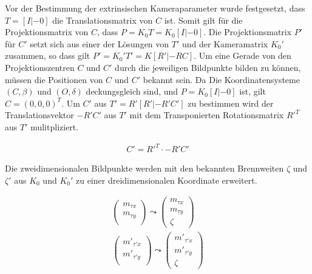 Vor der Bestimmung der extrinsischen Kameraparameter wurde festgesetzt, dass $T = [I|-0]$ die Translationsmatrix von $C$ ist. Somit gilt für die Projektionsmatrix von $C$, dass $P= K_0T =K_0[I|-0]$. Die Projektionsmatrix $P'$ für $C'$ setzt sich aus einer der Lösungen von $T'$ und der Kameramatrix $K_0'$ zusammen, so dass gilt $P'=K_0'T' = K[R'|-RC]$. Um eine Gerade von den Projektionszentren $C$ und $C'$ durch die jeweiligen Bildpunkte bilden zu können, müssen die Positionen von $C$ und $C'$ bekannt sein. Da Die Koordinatensysteme $(C,\beta)$ und $(O,\delta)$ deckungsgleich sind, und $P = K_0[I|-0]$ ist, gilt $C = (0,0,0)^T$.  Um $C'$ aus $T' = R'[R'|-R'C']$ zu bestimmen wird der Translationsvektor $-R'C'$ aus $T'$ mit dem Transponierten Rotationsmatrix $R'^T$ aus $T'$ mulitpliziert.

\begin{gather}
	C' =  R'^T \cdot -R'C' 
\end{gather}

%

Die zweidimensionalen Bildpunkte werden mit den bekannten Brennweiten $\zeta$ und $\zeta'$ aus $K_0$ und $K_0'$ zu einer dreidimensionalen Koordinate erweitert.

\begin{gather}
	\begin{pmatrix}
	m_{\tau x}\\
	m_{\tau y}\\
	\end{pmatrix} \leadsto 
		\begin{pmatrix}
	m_{\tau x} \\
	m_{\tau y}\\
	\zeta
	\end{pmatrix}\\
		\begin{pmatrix}
	m'_{\tau' x}\\
	m'_{\tau' y}\\
	\end{pmatrix} \leadsto 
	\begin{pmatrix}
	m'_{\tau' x} \\
	m'_{\tau' y}\\
	\zeta
	\end{pmatrix}	
\end{gather}

